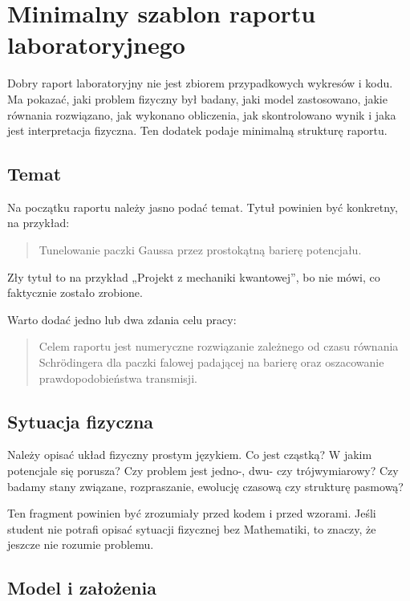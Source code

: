 \chapter{Minimalny szablon raportu laboratoryjnego}

\begin{summarybox}
Dobry raport laboratoryjny nie jest zbiorem przypadkowych wykresów i kodu. Ma
pokazać, jaki problem fizyczny był badany, jaki model zastosowano, jakie równania
rozwiązano, jak wykonano obliczenia, jak skontrolowano wynik i jaka jest
interpretacja fizyczna. Ten dodatek podaje minimalną strukturę raportu.
\end{summarybox}

\section{Temat}

Na początku raportu należy jasno podać temat. Tytuł powinien być konkretny, na przykład:
\begin{quote}
    Tunelowanie paczki Gaussa przez prostokątną barierę potencjału.
\end{quote}
Zły tytuł to na przykład „Projekt z mechaniki kwantowej”, bo nie mówi, co faktycznie zostało zrobione.

Warto dodać jedno lub dwa zdania celu pracy:
\begin{quote}
    Celem raportu jest numeryczne rozwiązanie zależnego od czasu równania Schrödingera dla paczki falowej padającej na barierę oraz oszacowanie prawdopodobieństwa transmisji.
\end{quote}

\section{Sytuacja fizyczna}

Należy opisać układ fizyczny prostym językiem. Co jest cząstką? W jakim potencjale się porusza? Czy problem jest jedno-, dwu- czy trójwymiarowy? Czy badamy stany związane, rozpraszanie, ewolucję czasową czy strukturę pasmową?

Ten fragment powinien być zrozumiały przed kodem i przed wzorami. Jeśli student nie potrafi opisać sytuacji fizycznej bez Mathematiki, to znaczy, że jeszcze nie rozumie problemu.

\section{Model i założenia}

